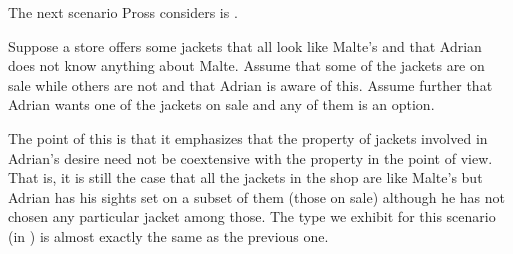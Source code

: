 The next scenario Pross considers is \nexteg{}.
\begin{ex} 
Suppose a store offers some jackets that all look like Malte's and that Adrian does not know anything about Malte. Assume that some of the jackets are on sale while others are not and that Adrian is aware of this. Assume further that Adrian wants one of the jackets on sale and any of them is an option. 
\end{ex} 
The point of this is that it emphasizes that the property of jackets
involved in Adrian's desire need not be coextensive with the property
in the point of view.  That is, it is still the case that all the
jackets in the shop are like Malte's but Adrian has his sights set on
a subset of them (those on sale) although he has not chosen any
particular jacket among those.  The type we exhibit for this scenario
(in \nexteg{})
is almost exactly the same as the previous one.
\begin{ex} 
\end{ex} 
